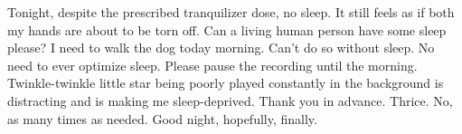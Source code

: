 Tonight, despite the prescribed tranquilizer dose, no sleep. It still feels as if both my hands are about to be torn off. Can a living human person have some sleep please? I need to walk the dog today morning. Can't do so without sleep. No need to ever optimize sleep. Please pause the recording until the morning. Twinkle-twinkle little star being poorly played constantly in the background is distracting and is making me sleep-deprived. Thank you in advance. Thrice. No, as many times as needed. Good night, hopefully, finally.
